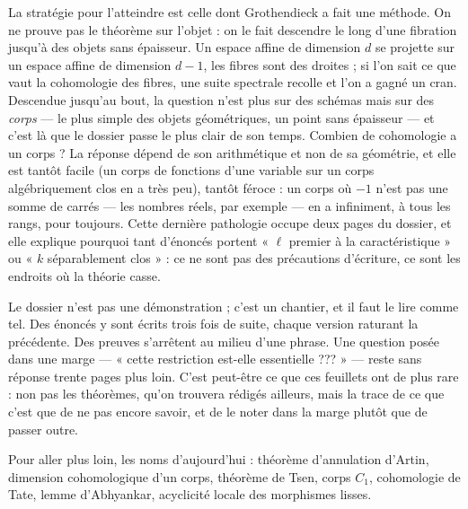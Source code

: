 \documentclass[11pt,a4paper]{article}
\begin{document}
\begin{resume}
La stratégie pour l'atteindre est celle dont Grothendieck a fait une méthode.
On ne prouve pas le théorème sur l'objet : on le fait descendre le long d'une
fibration jusqu'à des objets sans épaisseur. Un espace affine de dimension $d$
se projette sur un espace affine de dimension $d-1$, les fibres sont des
droites ; si l'on sait ce que vaut la cohomologie des fibres, une suite
spectrale recolle et l'on a gagné un cran. Descendue jusqu'au bout, la question
n'est plus sur des schémas mais sur des \emph{corps} — le plus simple des
objets géométriques, un point sans épaisseur — et c'est là que le dossier passe
le plus clair de son temps. Combien de cohomologie a un corps ? La réponse
dépend de son arithmétique et non de sa géométrie, et elle est tantôt facile
(un corps de fonctions d'une variable sur un corps algébriquement clos en a
très peu), tantôt féroce : un corps où $-1$ n'est pas une somme de carrés — les
nombres réels, par exemple — en a infiniment, à tous les rangs, pour toujours.
Cette dernière pathologie occupe deux pages du dossier, et elle explique
pourquoi tant d'énoncés portent « $\ell$ premier à la caractéristique » ou « $k$
séparablement clos » : ce ne sont pas des précautions d'écriture, ce sont les
endroits où la théorie casse.

Le dossier n'est pas une démonstration ; c'est un chantier, et il faut le lire
comme tel. Des énoncés y sont écrits trois fois de suite, chaque version
raturant la précédente. Des preuves s'arrêtent au milieu d'une phrase. Une
question posée dans une marge — « cette restriction est-elle essentielle
??? » — reste sans réponse trente pages plus loin. C'est peut-être ce que ces
feuillets ont de plus rare : non pas les théorèmes, qu'on trouvera rédigés
ailleurs, mais la trace de ce que c'est que de ne pas encore savoir, et de le
noter dans la marge plutôt que de passer outre.

Pour aller plus loin, les noms d'aujourd'hui : théorème d'annulation d'Artin,
dimension cohomologique d'un corps, théorème de Tsen, corps $C_1$, cohomologie
de Tate, lemme d'Abhyankar, acyclicité locale des morphismes lisses.

\end{resume}
\end{document}
